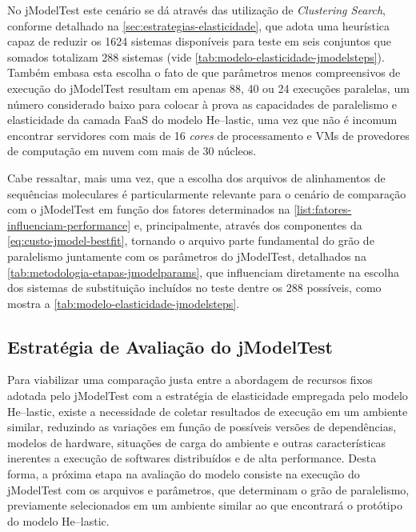 \documentclass[english,brazilian]{UNISINOSmonografia} %
\begin{document}
No jModelTest este cenário se dá através das utilização de \textit{Clustering Search}, conforme detalhado na \autoref{sec:estrategias-elasticidade}, que adota uma heurística capaz de reduzir os 1624 sistemas disponíveis para teste em seis conjuntos que somados totalizam 288 sistemas (vide \autoref{tab:modelo-elasticidade-jmodelsteps}).
Também embasa esta escolha o fato de que parâmetros menos compreensivos de execução do jModelTest resultam em apenas 88, 40 ou 24 execuções paralelas, um número considerado baixo para colocar à prova as capacidades de paralelismo e elasticidade da camada FaaS do modelo \textsf{He}--lastic, uma vez que não é incomum encontrar servidores com mais de 16 \textit{cores} de processamento e VMs de provedores de computação em nuvem com mais de 30 núcleos.


Cabe ressaltar, mais uma vez, que a escolha dos arquivos de alinhamentos de sequências moleculares é particularmente relevante para o cenário de comparação com o jModelTest em função dos fatores determinados na \autoref{list:fatores-influenciam-performance} e, principalmente, através dos componentes da \autoref{eq:custo-jmodel-bestfit}, tornando o arquivo parte fundamental do grão de paralelismo juntamente com os parâmetros do jModelTest, detalhados na \autoref{tab:metodologia-etapas-jmodelparams}, que influenciam diretamente na escolha dos sistemas de substituição incluídos no teste dentre os 288 possíveis, como mostra a \autoref{tab:modelo-elasticidade-jmodelsteps}.



\subsection{Estratégia de Avaliação do jModelTest}


Para viabilizar uma comparação justa entre a abordagem de recursos fixos adotada pelo jModelTest com a estratégia de elasticidade empregada pelo modelo \textsf{He}--lastic, existe a necessidade de coletar resultados de execução em um ambiente similar, reduzindo as variações em função de possíveis versões de dependências, modelos de hardware, situações de carga do ambiente e outras características inerentes a execução de softwares distribuídos e de alta performance.
Desta forma, a próxima etapa na avaliação do modelo consiste na execução do jModelTest com os arquivos e parâmetros, que determinam o grão de paralelismo, previamente selecionados em um ambiente similar ao que encontrará o protótipo do modelo \textsf{He}--lastic.
\end{document}
